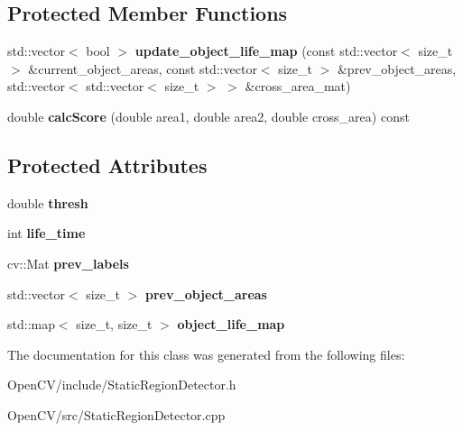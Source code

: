 \subsection*{Protected Member Functions}
\begin{DoxyCompactItemize}
\item 
\hypertarget{classskl_1_1_static_region_detector_aa3cff990aee433457901e8a75a575511}{}\label{classskl_1_1_static_region_detector_aa3cff990aee433457901e8a75a575511} 
std\+::vector$<$ bool $>$ {\bfseries update\+\_\+object\+\_\+life\+\_\+map} (const std\+::vector$<$ size\+\_\+t $>$ \&current\+\_\+object\+\_\+areas, const std\+::vector$<$ size\+\_\+t $>$ \&prev\+\_\+object\+\_\+areas, std\+::vector$<$ std\+::vector$<$ size\+\_\+t $>$ $>$ \&cross\+\_\+area\+\_\+mat)
\item 
\hypertarget{classskl_1_1_static_region_detector_ac3bb59ccc2fd2924e9629aa0ad7f81e4}{}\label{classskl_1_1_static_region_detector_ac3bb59ccc2fd2924e9629aa0ad7f81e4} 
double {\bfseries calc\+Score} (double area1, double area2, double cross\+\_\+area) const
\end{DoxyCompactItemize}
\subsection*{Protected Attributes}
\begin{DoxyCompactItemize}
\item 
\hypertarget{classskl_1_1_static_region_detector_a25e5612d213f6bb3c88619c18dd4c34f}{}\label{classskl_1_1_static_region_detector_a25e5612d213f6bb3c88619c18dd4c34f} 
double {\bfseries thresh}
\item 
\hypertarget{classskl_1_1_static_region_detector_a7834bd2105ac6283f300fcba18654bee}{}\label{classskl_1_1_static_region_detector_a7834bd2105ac6283f300fcba18654bee} 
int {\bfseries life\+\_\+time}
\item 
\hypertarget{classskl_1_1_static_region_detector_aa098c876dadb30192223065f08aa190a}{}\label{classskl_1_1_static_region_detector_aa098c876dadb30192223065f08aa190a} 
cv\+::\+Mat {\bfseries prev\+\_\+labels}
\item 
\hypertarget{classskl_1_1_static_region_detector_aad91aa7788b52402a7f0bdb0bf7fcb9f}{}\label{classskl_1_1_static_region_detector_aad91aa7788b52402a7f0bdb0bf7fcb9f} 
std\+::vector$<$ size\+\_\+t $>$ {\bfseries prev\+\_\+object\+\_\+areas}
\item 
\hypertarget{classskl_1_1_static_region_detector_a23d3aa54be57f5f856aa28c0a6799f6a}{}\label{classskl_1_1_static_region_detector_a23d3aa54be57f5f856aa28c0a6799f6a} 
std\+::map$<$ size\+\_\+t, size\+\_\+t $>$ {\bfseries object\+\_\+life\+\_\+map}
\end{DoxyCompactItemize}


The documentation for this class was generated from the following files\+:\begin{DoxyCompactItemize}
\item 
Open\+C\+V/include/Static\+Region\+Detector.\+h\item 
Open\+C\+V/src/Static\+Region\+Detector.\+cpp\end{DoxyCompactItemize}

